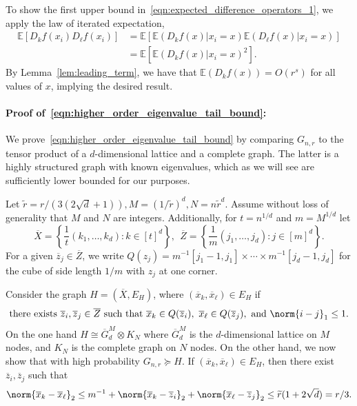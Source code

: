 \documentclass{article}
\newcommand{\set}[1]{\left\{#1\right\}}
\newcommand{\1}{\mathbf{1}}
\newcommand{\Ebb}{\mathbb{E}}
\newcommand{\wt}[1]{\widetilde{#1}}
\newcommand{\ol}[1]{\overline{#1}}
\theoremstyle{alden}
\theoremstyle{aldenthm}
\theoremstyle{definition}
\theoremstyle{remark}
\begin{document}
To show the first upper bound in~\eqref{eqn:expected_difference_operators_1}, we apply the law of iterated expectation, 
\begin{align}
\Ebb\left[D_kf(x_i)D_{\ell}f(x_i)\right] & = \Ebb\left[\Ebb\left(D_kf(x)|x_i = x\right) \Ebb\left(D_{\ell}f(x)|x_i = x\right)\right] \nonumber \\
& = \Ebb\left[\Ebb\left(D_kf(x)|x_i = x\right)^2\right]. \label{eqn:expected_difference_operators_pf1}
\end{align}
By Lemma~\ref{lem:leading_term}, we have that $\Ebb(D_kf(x)) = O(r^s)$ for all values of $x$, implying the desired result.

\paragraph{Proof of~\eqref{eqn:higher_order_eigenvalue_tail_bound}:}

We prove~\eqref{eqn:higher_order_eigenvalue_tail_bound} by comparing $G_{n,r}$ to the tensor product of a $d$-dimensional lattice and a complete graph. The latter is a highly structured graph with known eigenvalues, which as we will see are sufficiently lower bounded for our purposes.

Let $\wt{r} = r/(3(2\sqrt{d} + 1)), M = (1/\wt{r})^d, N = n\wt{r}^d$. Assume without loss of generality that $M$ and $N$ are integers. Additionally, for $t = n^{1/d}$ and $m = M^{1/d}$ let 
\begin{equation*}
\overline{X} = \set{\frac{1}{t}(k_1,\ldots,k_d): k \in [t]^d},~~ \overline{Z} = \set{\frac{1}{m}(j_1,\ldots,j_d): j \in [m]^d}.
\end{equation*}
For a given $\overline{z}_j \in \overline{Z}$, we write $Q(z_j) = m^{-1}[j_1 - 1,j_1] \times \cdots \times m^{-1}[j_d - 1,j_d]$ for the cube of side length $1/m$ with $z_j$ at one corner. 

Consider the graph $H = (\overline{X}, E_H)$, where $(\ol{x}_k, \ol{x}_{\ell}) \in E_H$ if
\begin{equation*}
\textrm{there exists}~\ol{z}_i, \ol{z}_j \in \ol{Z}~\textrm{such that}~\ol{x}_k \in Q(\ol{z}_i),~ \ol{x}_\ell \in Q(\ol{z}_j),~\textrm{and}~\norm{i - j}_1 \leq 1.
\end{equation*}
On the one hand $H \cong \ol{G}^M_d \otimes K_N$ where $\ol{G}^M_d$ is the $d$-dimensional lattice on $M$ nodes, and $K_N$ is the complete graph on $N$ nodes. On the other hand, we now show that with high probability $G_{n,r} \succeq H$. If $(\ol{x}_k, \ol{x}_{\ell}) \in E_H$, then there exist $\ol{z}_i, \ol{z}_j$ such that
\begin{equation*}
\norm{\ol{x}_k - \ol{x}_{\ell}}_2 \leq m^{-1} + \norm{\ol{x}_k - \ol{z}_{i}}_2 + \norm{\ol{x}_{\ell} - \ol{z}_{j}}_2 \leq \wt{r}(1 + 2\sqrt{d}) = r/3.
\end{equation*}
\end{document}
